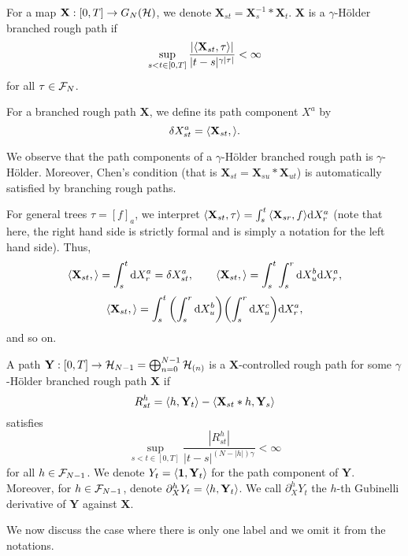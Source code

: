 \documentclass[11pt]{style/preprint}
\begin{document}
\begin{definition}
  For a map \(\mathbf{X} : [0, T] \to G_N({\mathcal H})\), we denote \(\mathbf{X}_{st} = \mathbf{X}^{-1}_s * \mathbf{X}_t\).
  \(\mathbf{X}\) is a \(\gamma\)-H\"older branched rough path if 
  \[\sup_{s < t \in [0, T]} \frac{|\< \mathbf{X}_{st}, \tau\>|} {|t - s|^{\gamma|\tau|}} < \infty\]
  for all \(\tau \in {\mathcal F}_N\).

  For a branched rough path \(\mathbf{X}\), we define its path component \(X^a\) by 
  \[\delta X^a_{st} = \< \mathbf{X}_{st}, \tree<X>\>.\]
\end{definition}

We observe that the path components of a \(\gamma\)-H\"older branched rough path is \(\gamma\)-H\"older. 
Moreover, Chen's condition (that is \(\mathbf{X}_{st} = \mathbf{X}_{su} * \mathbf{X}_{ut}\)) is automatically 
satisfied by branching rough paths. 

For general trees \(\tau = [f]_a\), we interpret \(\< \mathbf{X}_{st}, \tau\> = 
  \int_s^t \< \mathbf{X}_{sr}, f\> \dd X^a_r\) (note that here, the right hand side is strictly 
formal and is simply a notation for the left hand side). Thus, 
\[\< \mathbf{X}_{st}, \tree<X> \> = \int_s^t \dd X^a_r = \delta X^a_{st}, \qquad
  \< \mathbf{X}_{st}, \tree<1> \> = \int_s^t \int_s^r \dd X^b_u \dd X^a_r,\]
\[\< \mathbf{X}_{st}, \tree<2>\> = \int_s^t \left(\int_s^r \dd X^b_u\right) \left(\int_s^r \dd X^c_u\right) \dd X^a_r,\] 
and so on.

\begin{definition}
  A path \(\mathbf{Y} : [0, T] \to {\mathcal H}_{N - 1} = \bigoplus_{n = 0}^{N - 1} {\mathcal H}_{(n)}\) is a 
  \(\mathbf{X}\)-controlled rough path for some \(\gamma\)-H\"older branched rough path \(\mathbf{X}\) if 
  \[R^h_{st} = \< h, \mathbf{Y}_t\> - \< \mathbf{X}_{st} * h, \mathbf{Y}_s\>\]
  satisfies 
  \[\sup_{s < t \in [0, T]} \frac{|R^h_{st}|}{|t - s|^{(N - |h|)\gamma}} < \infty\] 
  for all \(h \in {\mathcal F}_{N - 1}\). We denote \(Y_t = \< \mathbf{1}, \mathbf{Y}_t\>\) for the 
  path component of \(\mathbf{Y}\). Moreover, for \(h \in {\mathcal F}_{N - 1}\), denote 
  \(\partial^h_X Y_t = \< h, \mathbf{Y}_t\>\). We call \(\partial^h_X Y_t\) the \(h\)-th Gubinelli 
  derivative of \(\mathbf{Y}\) against \(\mathbf{X}\).
\end{definition}

We now discuss the case where there is only one label and we omit it from the notations.
\end{document}
